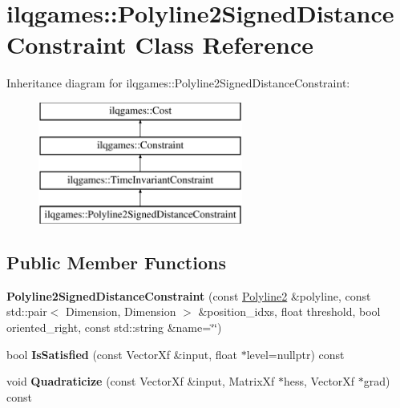 \hypertarget{classilqgames_1_1_polyline2_signed_distance_constraint}{}\section{ilqgames\+:\+:Polyline2\+Signed\+Distance\+Constraint Class Reference}
\label{classilqgames_1_1_polyline2_signed_distance_constraint}
Inheritance diagram for ilqgames\+:\+:Polyline2\+Signed\+Distance\+Constraint\+:\begin{figure}[H]
\begin{center}
\leavevmode
\includegraphics[height=4.000000cm]{classilqgames_1_1_polyline2_signed_distance_constraint}
\end{center}
\end{figure}
\subsection*{Public Member Functions}
\begin{DoxyCompactItemize}
\item 
{\bfseries Polyline2\+Signed\+Distance\+Constraint} (const \hyperlink{classilqgames_1_1_polyline2}{Polyline2} \&polyline, const std\+::pair$<$ Dimension, Dimension $>$ \&position\+\_\+idxs, float threshold, bool oriented\+\_\+right, const std\+::string \&name=\char`\"{}\char`\"{})\hypertarget{classilqgames_1_1_polyline2_signed_distance_constraint_acbcaeeb0b52b5de6fc25a03487677bc1}{}\label{classilqgames_1_1_polyline2_signed_distance_constraint_acbcaeeb0b52b5de6fc25a03487677bc1}

\item 
bool {\bfseries Is\+Satisfied} (const Vector\+Xf \&input, float $\ast$level=nullptr) const \hypertarget{classilqgames_1_1_polyline2_signed_distance_constraint_a730ac2aa81923ed150e010de67109962}{}\label{classilqgames_1_1_polyline2_signed_distance_constraint_a730ac2aa81923ed150e010de67109962}

\item 
void {\bfseries Quadraticize} (const Vector\+Xf \&input, Matrix\+Xf $\ast$hess, Vector\+Xf $\ast$grad) const \hypertarget{classilqgames_1_1_polyline2_signed_distance_constraint_a0468a14f66cc448cc21a1351c393ec21}{}\label{classilqgames_1_1_polyline2_signed_distance_constraint_a0468a14f66cc448cc21a1351c393ec21}

\end{DoxyCompactItemize}
